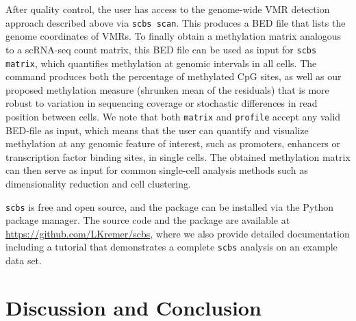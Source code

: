 \documentclass[twocolumn,10pt]{article}
\begin{document}
After quality control, the user has access to the genome-wide VMR detection approach described above via \texttt{scbs scan}. This produces a BED file that lists the genome coordinates of VMRs. To finally obtain a methylation matrix analogous to a scRNA-seq count matrix, this BED file can be used as input for \texttt{scbs matrix}, which quantifies methylation at genomic intervals in all cells. The command produces both the percentage of methylated CpG sites, as well as our proposed methylation measure (shrunken mean of the residuals) that is more robust to variation in sequencing coverage or stochastic differences in read position between cells. We note that both \texttt{matrix} and \texttt{profile} accept any valid BED-file as input, which means that the user can quantify and visualize methylation at any genomic feature of interest, such as promoters, enhancers or transcription factor binding sites, in single cells. The obtained methylation matrix can then serve as input for common single-cell analysis methods such as dimensionality reduction and cell clustering.

\texttt{scbs} is free and open source, and the package can be installed via the Python package manager. The source code and the package are available at \href{https://github.com/LKremer/scbs}{https://github.com/LKremer/scbs}, where we also provide detailed documentation including a tutorial that demonstrates a complete \texttt{scbs} analysis on an example data set.




\section{Discussion and Conclusion}

\end{document}
